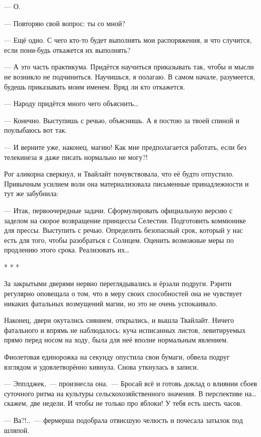 \documentclass[twoside,a5paper,12pt]{extbook}
\begin{document}
— О.

— Повторяю свой вопрос: ты со мной?

— Ещё одно. С чего кто-то будет выполнять мои распоряжения, и что случится, если пони-будь откажется их выполнять?

— А это часть практикума. Придётся научиться приказывать так, чтобы и мысли не возникло не подчиниться. Научишься, я полагаю. В самом начале, разумеется, будешь приказывать моим именем. Вряд ли кто откажется.

— Народу придётся много чего объяснить…

— Конечно. Выступишь с речью, объяснишь. А я постою за твоей спиной и поулыбаюсь вот так.

— И верните уже, наконец, магию! Как мне предполагается работать, если без телекинеза я даже писать нормально не могу?!

Рог аликорна сверкнул, и Твайлайт почувствовала, что её будто отпустило. Привычным усилием воли она материализовала письменные принадлежности и тут же забубнила:

— Итак, первоочередные задачи. Сформулировать официальную версию с заделом на скорое возвращение принцессы Селестии. Подготовить коммюнике для прессы. Выступить с речью. Определить безопасный срок, который у нас есть для того, чтобы разобраться с Солнцем. Оценить возможные меры по продлению этого срока. Реализовать их…

\begin{center}* * *\end{center}

За закрытыми дверями нервно переглядывались и ёрзали подруги. Рэрити регулярно оповещала о том, что в меру своих способностей она не чувствует никаких фатальных возмущений магии, но это не очень успокаивало.

Наконец, двери окутались сиянием, открылись, и вышла Твайлайт. Ничего фатального и впрямь не наблюдалось: куча исписанных листов, левитируемых прямо перед носом на ходу, была для неё вполне нормальным явлением.

Фиолетовая единорожка на секунду опустила свои бумаги, обвела подруг взглядом и удовлетворённо кивнула. Снова уткнулась в записи.

— Эпплджек, — произнесла она. — Бросай всё и готовь доклад о влиянии сбоев суточного ритма на культуры сельскохозяйственного значения. В перспективе на… скажем, две недели. И чтобы не только про яблоки! У тебя есть шесть часов.

— Ва?!.. — фермерша подобрала отвисшую челюсть и почесала затылок под шляпой.
\end{document}
